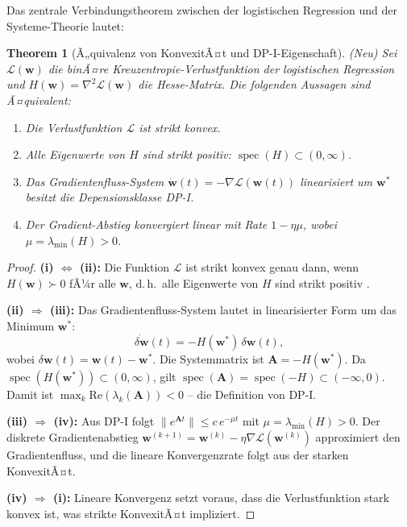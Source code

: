 ﻿\documentclass[12pt, a4paper]{article}
\newtheorem{theorem}{Theorem}[section]
\theoremstyle{definition}
\theoremstyle{remark}
\newcommand{\vw}{\bm{w}}
\newcommand{\vA}{\bm{A}}
\newcommand{\re}{\mathrm{Re}}
\newcommand{\spec}{\operatorname{spec}}
\begin{document}
Das zentrale Verbindungstheorem zwischen der logistischen Regression und der
Systeme-Theorie lautet:

\begin{theorem}[Ã„quivalenz von KonvexitÃ¤t und DP-I-Eigenschaft]
\label{thm:konvex_aequiv}
\textup{(Neu)} Sei $\mathcal{L}(\vw)$ die binÃ¤re Kreuzentropie-Verlustfunktion
der logistischen Regression und $H(\vw) = \nabla^2\mathcal{L}(\vw)$ die Hesse-Matrix.
Die folgenden Aussagen sind Ã¤quivalent:
\begin{enumerate}[label=(\roman*)]
  \item Die Verlustfunktion $\mathcal{L}$ ist strikt konvex.
  \item Alle Eigenwerte von $H$ sind strikt positiv: $\spec(H) \subset (0, \infty)$.
  \item Das Gradientenfluss-System
    $\dot{\vw}(t) = -\nabla\mathcal{L}(\vw(t))$
    linearisiert um $\vw^*$ besitzt die Depensionsklasse DP-I.
  \item Der Gradient-Abstieg konvergiert linear mit Rate $1 - \eta\mu$, wobei
    $\mu = \lambda_{\min}(H) > 0$.
\end{enumerate}
\end{theorem}

\begin{proof}
  \textbf{(i) $\Leftrightarrow$ (ii):} Die Funktion $\mathcal{L}$ ist strikt konvex
  genau dann, wenn $H(\vw) \succ 0$ fÃ¼r alle $\vw$, d.\,h.\ alle Eigenwerte von
  $H$ sind strikt positiv \citep[Theorem~4.1]{epp2026logreg}.

  \textbf{(ii) $\Rightarrow$ (iii):} Das Gradientenfluss-System lautet in
  linearisierter Form um das Minimum $\vw^*$:
  \[
    \dot{\delta\vw}(t) = -H(\vw^*)\, \delta\vw(t),
  \]
  wobei $\delta\vw(t) = \vw(t) - \vw^*$. Die Systemmatrix ist $\vA = -H(\vw^*)$.
  Da $\spec(H(\vw^*)) \subset (0,\infty)$, gilt $\spec(\vA) = \spec(-H) \subset (-\infty, 0)$.
  Damit ist $\max_k\re(\lambda_k(\vA)) < 0$ -- die Definition von DP-I.

  \textbf{(iii) $\Rightarrow$ (iv):} Aus DP-I folgt $\|e^{\vA t}\| \leq c\,e^{-\mu t}$
  mit $\mu = \lambda_{\min}(H) > 0$. Der diskrete Gradientenabstieg $\vw^{(k+1)} =
  \vw^{(k)} - \eta\nabla\mathcal{L}(\vw^{(k)})$ approximiert den Gradientenfluss,
  und die lineare Konvergenzrate folgt aus der starken KonvexitÃ¤t.

  \textbf{(iv) $\Rightarrow$ (i):} Lineare Konvergenz setzt voraus, dass die
  Verlustfunktion stark konvex ist, was strikte KonvexitÃ¤t impliziert. \qedhere
\end{proof}
\end{document}
